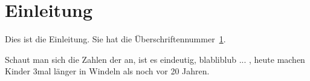 \section{Einleitung}
\label{sec:Einleitung}
Dies ist die Einleitung. Sie hat die Überschriftennummer~\ref{sec:Einleitung}.

Schaut man sich die Zahlen der an, ist es eindeutig, blabliblub ... , heute machen Kinder 3mal länger in Windeln als noch vor 20 Jahren.
